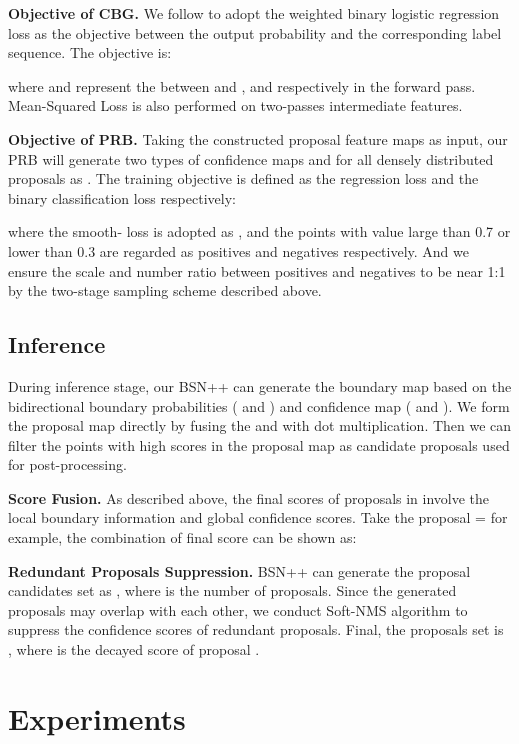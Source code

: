 \documentclass[letterpaper]{article} \usepackage{aaai21}  \usepackage{times}  \usepackage{helvet} \usepackage{courier}  \usepackage[hyphens]{url}  \usepackage{graphicx} \urlstyle{rm} \def\UrlFont{\rm}  \usepackage{natbib}  \usepackage{amsmath,amssymb} \usepackage{caption} \frenchspacing  \usepackage{color}
\begin{document}
\noindent
\textbf{Objective of CBG.} We follow \cite{BSN} to adopt the weighted binary logistic regression loss  as the objective between the output probability and the corresponding label sequence. The objective is:

where  and  represent the  between  and ,  and  respectively in the forward pass. Mean-Squared Loss is also performed on two-passes intermediate features. 


\noindent
\textbf{Objective of PRB.} Taking the constructed proposal feature maps  as input, our PRB will generate two types of confidence maps  and  for all densely distributed proposals as \cite{LinBMN}. The training objective is defined as the regression loss  and the binary classification loss  respectively:

where the smooth- loss \cite{Girshick2015Fast} is adopted as  , and the points   with value large than 0.7 or lower than 0.3 are regarded as positives and negatives respectively. And we ensure the scale and number ratio between positives and negatives to be near 1:1 by the two-stage sampling scheme described above.


\subsection{Inference}
During inference stage, our BSN++ can generate the boundary map  based on the bidirectional boundary probabilities ( and ) and confidence map ( and ). We form the proposal map  directly by fusing the  and  with dot multiplication. Then we can filter the points with high scores in the proposal map  as candidate proposals used for post-processing.


\noindent
\textbf{Score Fusion.} As described above, the final scores of proposals in  involve the local boundary information and global confidence scores. Take the proposal  =  for example, the combination of final score  can be shown as:



\noindent
\textbf{Redundant Proposals Suppression.} BSN++ can generate the proposal candidates set as , where  is the number of proposals. Since the generated proposals may overlap with each other, we conduct Soft-NMS \cite{Bodla2017} algorithm to suppress the confidence scores of redundant proposals. Final, the proposals set is , where  is the decayed score of proposal .



\section{Experiments}
\end{document}
